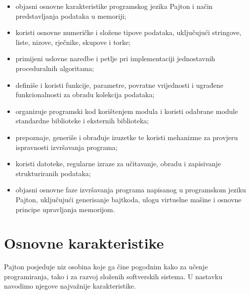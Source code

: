\begin{itemize}
	\item objasni osnovne karakteristike programskog jezika Pajton i
	način predstavljanja podataka u memoriji;
	
	\item koristi osnovne numeričke i složene tipove podataka, uključujući
	stringove, liste, nizove, rječnike, skupove i torke;
	
	\item primijeni uslovne naredbe i petlje pri implementaciji
	jednostavnih proceduralnih algoritama;
	
	\item definiše i koristi funkcije, parametre, povratne vrijednosti i
	ugrađene funkcionalnosti za obradu kolekcija podataka;
	
	\item organizuje programski kod korištenjem modula i koristi odabrane
	module standardne biblioteke i eksternih biblioteka;
	
	\item prepoznaje, generiše i obrađuje izuzetke te koristi mehanizme za
	provjeru ispravnosti izvršavanja programa;
	
	\item koristi datoteke,  regularne izraze za učitavanje,
	obradu i zapisivanje strukturiranih podataka;
	
	\item objasni osnovne faze izvršavanja programa napisanog u programskom jeziku Pajton, uključujući
	generisanje bajtkoda, ulogu virtuelne mašine i osnovne principe
	upravljanja memorijom.
\end{itemize}

\section{Osnovne karakteristike}

Pajton posjeduje niz osobina koje ga čine pogodnim kako za učenje programiranja, tako i za razvoj složenih softverskih sistema. U nastavku navodimo njegove najvažnije karakteristike.

